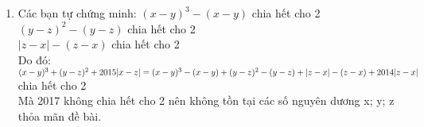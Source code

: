 \begin{bt}
{\begin{enumerate}
            $\Rightarrow y-2 ; x-2 \in u^{\prime}(4)=\{ \pm 1 ; \pm 2 ; \pm 4\}$ nhưng vì $x-2 ; y-2>-2$ và $x \geq y$\\[5px]
            Ta có 2 trường hợp sau :\\[5px]
            $
            \left\{\begin{array} { l } 
            { x - 2 = 4 } \\[5px]
            { y - 2 = 1 }
            \end{array} \Leftrightarrow \left\{\begin{array} { l } 
            { x = 6 } \\[5px]
            { y = 3 }
            \end{array} \text { hoặc } \left\{\begin{array} { l } 
            { x - 2 = 2 } \\[5px]
            { y - 2 = 2 }
            \end{array} \Leftrightarrow \left\{\begin{array}{l}
            x=4 \\[5px]
            y=4
            \end{array}\right.\right.\right.\right.
            $\\[5px]
            Có hai hình chữ nhật thỏa mãn bài toán :\\[5px]
            Hình chữ nhật có kích thước 6 và 3 ; 4 và 4 .
            \item  Các bạn tự chứng minh: $(x-y)^3-(x-y)$ chia hết cho 2\\[5px]
            $(y-z)^2-(y-z)$ chia hết cho 2\\[5px]
            $|z-x|-(z-x)$ chia hết cho 2\\[5px]
            Do đó:\\[5px]
            $(x-y)^3+(y-z)^2+2015|x-z|= \\[5px]
            (x-y)^3-(x-y)+(y-z)^2-(y-z)+|z-x|-(z-x)+2014|z-x|$
            chia hết cho 2\\[5px]
            Mà 2017 không chia hết cho 2 nên không tồn tại các số nguyên dương x; y; z thỏa mãn đề bài.
        \end{enumerate}
    } 
\end{bt}

